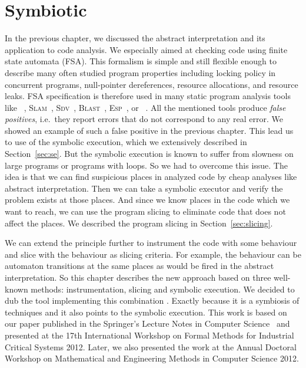 
\chapter{Symbiotic}\label{sec:fmics}
In the previous chapter, we discussed the abstract interpretation and its
application to code analysis. We especially aimed at checking code using
finite state automata (FSA).  This formalism is simple and still flexible
enough to describe many often studied program properties including locking
policy in concurrent programs, null-pointer dereferences, resource
allocations, and resource leaks. FSA specification is therefore used in many
static program analysis tools like \xgcc~\cite{metal},
\textsc{Slam}~\cite{slam_decade, slam2}, \textsc{Sdv}~\cite{sdv},
\textsc{Blast}~\cite{blast}, \textsc{Esp}~\cite{esp}, or \stan~\cite{stanse}.
All the mentioned tools produce \emph{false positives}, i.e.\ they report
errors that do not correspond to any real error. We showed an example of such
a false positive in the previous chapter. This lead us to use of the symbolic
execution, which we extensively described in Section~\ref{sec:se}. But the
symbolic execution is known to suffer from slowness on large programs or
programs with loops. So we had to overcome this issue. The idea is that we can
find suspicious places in analyzed code by cheap analyses like abstract
interpretation. Then we can take a symbolic executor and verify the problem
exists at those places. And since we know places in the code which we want to
reach, we can use the program slicing to eliminate code that does not affect
the places. We described the program slicing in Section~\ref{sec:slicing}.

We can extend the principle further to instrument the code with some behaviour
and slice with the behaviour as slicing criteria. For example, the behaviour
can be automaton transitions at the same places as would be fired in the
abstract interpretation. So this chapter describes the new approach based on
three well-known methods: instrumentation, slicing and symbolic execution. We
decided to dub the tool implementing this combination \symbio. Exactly because
it is a symbiosis of techniques and it also points to the symbolic execution.
This work is based on our paper published in the Springer's Lecture Notes in
Computer Science~\cite{symbiotic} and presented at the 17th International
Workshop on Formal Methods for Industrial Critical Systems 2012. Later, we
also presented the work at the Annual Doctoral Workshop on Mathematical and
Engineering Methods in Computer Science 2012.

